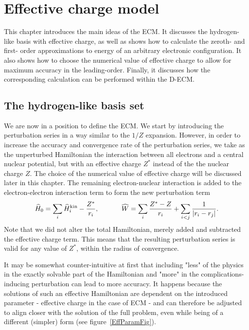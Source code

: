 \chapter{Effective charge model}
\label{ch:ECM}

This chapter introduces the main ideas of the ECM. It discusses the hydrogen-like basis with effective charge, as well as shows how to calculate the zeroth- and first- order approximations to energy of an arbitrary electronic configuration. It also shows how to choose the numerical value of effective charge to allow for maximum accuracy in the leading-order. Finally, it discusses how the corresponding calculation can be performed within the D-ECM.

\section{The hydrogen-like basis set}

  We are now in a position to define the ECM. We start by introducing the perturbation series in a way similar to the $1/Z$ expansion. However, in order to increase the accuracy and convergence rate of the perturbation series, we take as the unperturbed Hamiltonian the interaction between all electrons and a central nuclear potential, but with an effective charge $Z^*$ instead of the the nuclear charge $Z$. The choice of  the numerical value of effective charge will be discussed later in this chapter. The remaining electron-nuclear interaction is added to the electron-electron interaction term to form the new perturbation term
\begin{equation}
 	\widehat{H}_0 = \sum_i \widehat{H}^{\rm{kin}}_i - \frac{Z^*}{r_i},~~~~~~~~~~\widehat{W} = \sum_i \frac{Z^*-Z}{r_i} + \sum_{i<j} \frac{1}{|r_i-r_j|}.
\end{equation}
	Note that we did not alter the total Hamiltonian, merely added and subtracted the effective charge term. This means that the resulting perturbation series is valid for any value of $Z^*$, within the radius of convergence.

It may be somewhat counter-intuitive at first that including "less" of the physics in the exactly solvable part of the Hamiltonian and "more" in the complications-inducing perturbation can lead to more accuracy. It happens because the solutions of such an effective Hamiltonian are dependent on the introduced parameter - effective charge in the case of ECM - and can therefore be adjusted to align closer with the solution of the full problem, even while being of a different (simpler) form (see figure~\ref{EffParamFig}).

